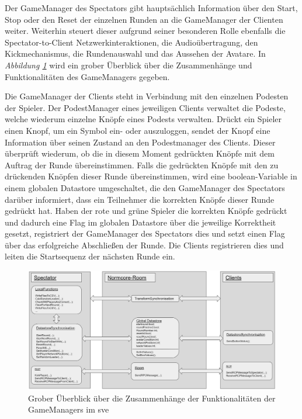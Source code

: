 \documentclass[a4paper,11pt]{article}%
\renewcommand{\\}{\vspace*{0.5\baselineskip} \newline}
\begin{document}
Der GameManager des Spectators gibt hauptsächlich Information über den Start, Stop oder den Reset der einzelnen Runden an die GameManager der Clienten weiter. Weiterhin steuert dieser aufgrund seiner besonderen Rolle ebenfalls die Spectator-to-Client Netzwerkinteraktionen, die Audioübertragung, den Kickmechanismus, die Rundenauswahl und das Aussehen der Avatare.
In \textit{Abbildung \ref{GameManagerClientSpectator}} wird ein grober Überblick über die Zusammenhänge und Funktionalitäten des GameManagers gegeben.

Die GameManager der Clients steht in Verbindung mit den einzelnen Podesten der Spieler. Der PodestManager eines jeweiligen Clients verwaltet die Podeste, welche wiederum einzelne Knöpfe eines Podests verwalten. 
Drückt ein Spieler einen Knopf, um ein Symbol ein- oder auszuloggen, sendet der Knopf eine Information über seinen Zustand an den Podestmanager des Clients. Dieser überprüft wiederum, ob die in diesem Moment gedrückten Knöpfe mit dem Auftrag der Runde übereinstimmen. Falls die gedrückten Knöpfe mit den zu drückenden Knöpfen dieser Runde übereinstimmen, wird eine boolean-Variable in einem globalen Datastore umgeschaltet, die den GameManager des Spectators darüber informiert, dass ein Teilnehmer die korrekten Knöpfe dieser Runde gedrückt hat. Haben der rote und grüne Spieler die korrekten Knöpfe gedrückt und dadurch eine Flag im globalen Datastore über die jeweilige Korrektheit gesetzt, registriert der GameManager des Spectators dies und setzt einen Flag über das erfolgreiche Abschließen der Runde. Die Clients registrieren dies und leiten die Startsequenz der nächsten Runde ein. 

\begin{figure}[H]
		\begin{footnotesize}
		\centering
			\includegraphics[width=\textwidth]{Abbildungen/GameManagerClientSpectator.jpg}
			\caption[Funktionalitäten des GameManagers]{Grober Überblick über die Zusammenhänge der Funktionalitäten der GameManagers im \ac{sve}}
			\label{GameManagerClientSpectator}
		\end{footnotesize}
	\end{figure}
\end{document}
